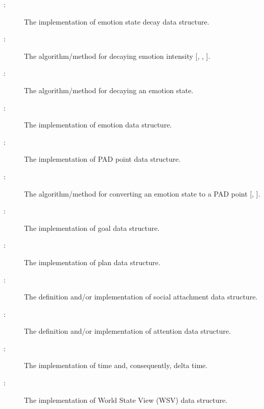 \begin{description}
    \item[ \actheacnum \label{acEmotionDecayStateImpl}:]
    The implementation of emotion state decay data structure.

    \item[ \actheacnum \label{acDecayIntensityAlgo}:] The
    algorithm/method for decaying emotion intensity [,
    , ].

    \item[ \actheacnum \label{acDecayStateAlgo}:] The
    algorithm/method for decaying an emotion state.

    \item[ \actheacnum \label{acEmotionState}:] The
    implementation of emotion data structure.

    \item[ \actheacnum \label{acPADPointType}:] The
    implementation of PAD point data structure.

    \item[ \actheacnum \label{acState2PADAlgo}:] The
    algorithm/method for converting an emotion state to a PAD point
    [, ].

    \item[ \actheacnum \label{acGoalImpl}:] The
    implementation of goal data structure.

    \item[ \actheacnum \label{acPlanImpl}:] The
    implementation of plan data structure.

    \item[ \actheacnum \label{acAttachmentImpl}:] The
    definition and/or implementation of social attachment data structure.

    \item[ \actheacnum \label{acAttentionImpl}:] The
    definition and/or implementation of attention data structure.

    \item[ \actheacnum \label{acTimeImpl}:] The
    implementation of time and, consequently, delta time.

    \item[ \actheacnum \label{acWorldStateImpl}:] The
    implementation of World State View (WSV) data structure.


\end{description}
